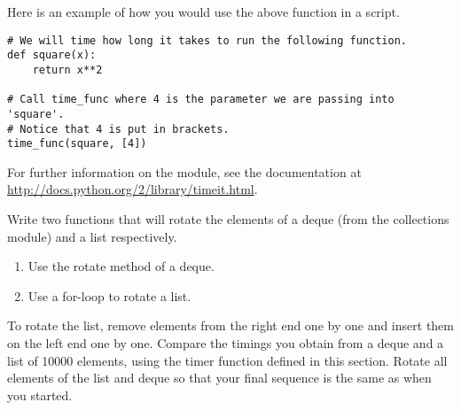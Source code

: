 Here is an example of how you would use the above function in a script.

\begin{lstlisting}
# We will time how long it takes to run the following function.
def square(x):
    return x**2

# Call time_func where 4 is the parameter we are passing into 'square'.
# Notice that 4 is put in brackets.
time_func(square, [4])
\end{lstlisting}

For further information on the  module, see the documentation at \url{http://docs.python.org/2/library/timeit.html}.


\begin{problem}
Write two functions that will rotate the elements of a deque (from the collections module) and a list respectively.
\begin{enumerate}
\item Use the rotate method of a deque.
\item Use a for-loop to rotate a list.
\end{enumerate}

To rotate the list, remove elements from the right end one by one and insert them on the left end one by one.
Compare the timings you obtain from a deque and a list of 10000 elements, using the timer function defined in this section. Rotate all elements of the list and deque so that your final sequence is the same as when you started.
\end{problem}

